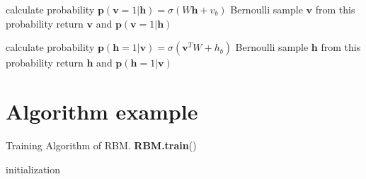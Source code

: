 \documentclass[a4paper]{article}
\begin{document}
\begin{algorithm}[H]
	 \caption{calculate $\bm{p}(\bm{v}|\bm{h})$ and sample $\bm{v}$ \textbf{\lstinline{RBM.v_given_h}}() }
  \SetAlgoLined
  calculate probability $\bm{p}(\bm{v} = 1|\bm{h}) = \sigma( W \bm{h} + v_b)$\;
  Bernoulli sample $\bm{v}$ from this probability\;
  return $\bm{v}$ and $\bm{p}(\bm{v} = 1|\bm{h})$\;
 
\end{algorithm}


\begin{algorithm}[H]
	 \caption{calculate $\bm{p}(\bm{h}|\bm{v})$ and sample $\bm{h}$ \textbf{\lstinline{RBM.h_given_v}}() }
  \SetAlgoLined
  calculate probability $\bm{p}(\bm{h} = 1|\bm{v}) = \sigma(\bm{v}^T W  + h_b)$\;
  Bernoulli sample $\bm{h}$ from this probability\;
  return $\bm{h}$ and $\bm{p}(\bm{h} = 1|\bm{v})$\;
 
\end{algorithm}





\section{Algorithm example}

\begin{algorithm}
	 \caption{Training Algorithm of RBM. \textbf{RBM.train}() }
  \SetAlgoLined
  initialization\;
 
\end{algorithm}
\end{document}
